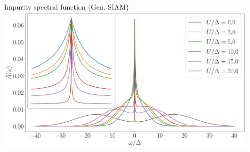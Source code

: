 \documentclass[aspectratio=169]{beamer}
\begin{document}
\begin{frame}[noframenumbering]{Impurity spectral function (Gen. SIAM)}
	\centering
	\includegraphics[width=0.95\textwidth]{figures/gen_siam_spec_func.pdf}
\end{frame}
\end{document}
